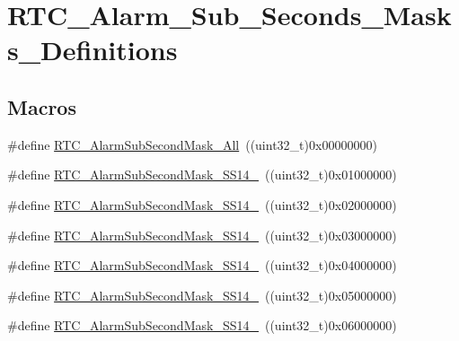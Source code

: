 \hypertarget{group___r_t_c___alarm___sub___seconds___masks___definitions}{\section{R\-T\-C\-\_\-\-Alarm\-\_\-\-Sub\-\_\-\-Seconds\-\_\-\-Masks\-\_\-\-Definitions}
\label{group___r_t_c___alarm___sub___seconds___masks___definitions}
}
\subsection*{Macros}
\begin{DoxyCompactItemize}
\item 
\#define \hyperlink{group___r_t_c___alarm___sub___seconds___masks___definitions_ga7ca3d2cc7822e86a0397137400bff1e8}{R\-T\-C\-\_\-\-Alarm\-Sub\-Second\-Mask\-\_\-\-All}~((uint32\-\_\-t)0x00000000)
\item 
\#define \hyperlink{group___r_t_c___alarm___sub___seconds___masks___definitions_gae7d0420a85eea688e04bbccd27ee5ce9}{R\-T\-C\-\_\-\-Alarm\-Sub\-Second\-Mask\-\_\-\-S\-S14\-\_}~((uint32\-\_\-t)0x01000000)
\item 
\#define \hyperlink{group___r_t_c___alarm___sub___seconds___masks___definitions_ga9a31704b58e40877680090cca7bfeb29}{R\-T\-C\-\_\-\-Alarm\-Sub\-Second\-Mask\-\_\-\-S\-S14\-\_}~((uint32\-\_\-t)0x02000000)
\item 
\#define \hyperlink{group___r_t_c___alarm___sub___seconds___masks___definitions_gaa5938e9c92c2467ce5c6fea0b05cb498}{R\-T\-C\-\_\-\-Alarm\-Sub\-Second\-Mask\-\_\-\-S\-S14\-\_}~((uint32\-\_\-t)0x03000000)
\item 
\#define \hyperlink{group___r_t_c___alarm___sub___seconds___masks___definitions_gadefaba27e57718b2c164d0616e6ca0be}{R\-T\-C\-\_\-\-Alarm\-Sub\-Second\-Mask\-\_\-\-S\-S14\-\_}~((uint32\-\_\-t)0x04000000)
\item 
\#define \hyperlink{group___r_t_c___alarm___sub___seconds___masks___definitions_ga05e639e8796dd05b70ac3043cd578644}{R\-T\-C\-\_\-\-Alarm\-Sub\-Second\-Mask\-\_\-\-S\-S14\-\_}~((uint32\-\_\-t)0x05000000)
\item 
\#define \hyperlink{group___r_t_c___alarm___sub___seconds___masks___definitions_gac4105d5f52321db4c5402a7f19e4cd40}{R\-T\-C\-\_\-\-Alarm\-Sub\-Second\-Mask\-\_\-\-S\-S14\-\_}~((uint32\-\_\-t)0x06000000)
\item 

\end{DoxyCompactItemize}
